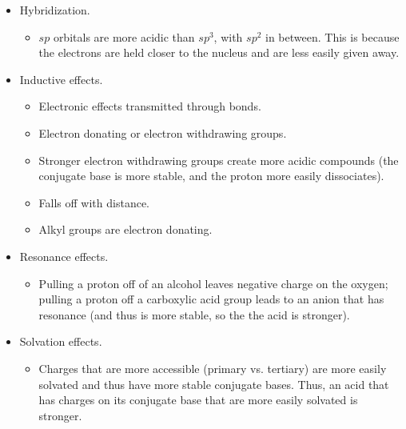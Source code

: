 \documentclass[../notes.tex]{subfiles}
\begin{document}
\begin{itemize}
\begin{itemize}
        \item Hybridization.
        \begin{itemize}
            \item $sp$ orbitals are more acidic than $sp^3$, with $sp^2$ in between. This is because the electrons are held closer to the nucleus and are less easily given away.
        \end{itemize}
        \item Inductive effects.
        \begin{itemize}
            \item Electronic effects transmitted through bonds.
            \item Electron donating or electron withdrawing groups.
            \item Stronger electron withdrawing groups create more acidic compounds (the conjugate base is more stable, and the proton more easily dissociates).
            \item Falls off with distance.
            \item Alkyl groups are electron donating.
        \end{itemize}
        \item Resonance effects.
        \begin{itemize}
            \item Pulling a proton off of an alcohol leaves negative charge on the oxygen; pulling a proton off a carboxylic acid group leads to an anion that has resonance (and thus is more stable, so the the acid is stronger).
        \end{itemize}
        \item Solvation effects.
        \begin{itemize}
            \item Charges that are more accessible (primary vs. tertiary) are more easily solvated and thus have more stable conjugate bases. Thus, an acid that has charges on its conjugate base that are more easily solvated is stronger.
        \end{itemize}
    \end{itemize}
\end{itemize}
\end{document}

